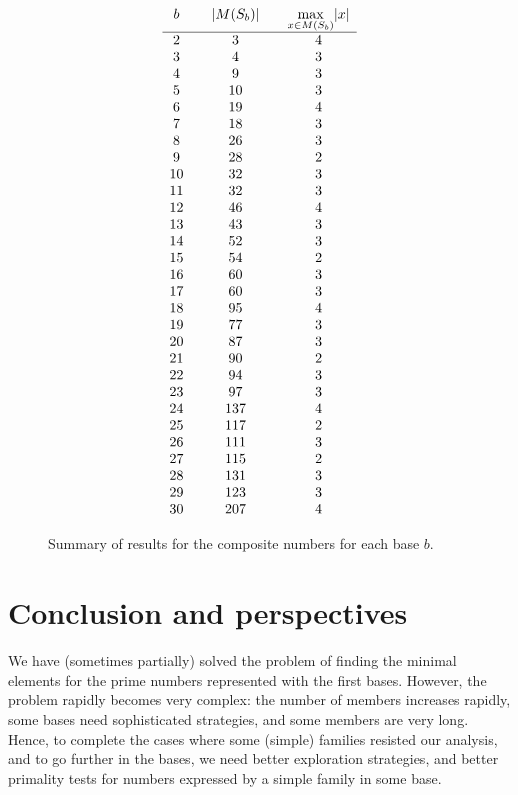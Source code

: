 \documentclass[12pt]{article}
\theoremstyle{plain}
\theoremstyle{definition}
\newcommand{\0}{\mathtt{0}}
\newcommand{\1}{\mathtt{1}}
\newcommand{\2}{\mathtt{2}}
\newcommand{\3}{\mathtt{3}}
\newcommand{\4}{\mathtt{4}}
\newcommand{\5}{\mathtt{5}}
\newcommand{\6}{\mathtt{6}}
\newcommand{\7}{\mathtt{7}}
\newcommand{\8}{\mathtt{8}}
\newcommand{\9}{\mathtt{9}}
\begin{document}
\begin{figure}\[\begin{array}{c@{\qquad}c@{\qquad}c}
b & \lvert M(S_b)\rvert & \max\limits_{x\in M(S_b)}\lvert x\rvert \\ \hline
2 & 3 & 4 \\
3 & 4 & 3 \\
4 & 9 & 3 \\
5 & 10 & 3 \\
6 & 19 & 4 \\
7 & 18 & 3\\
8 & 26 & 3 \\
9 & 28 & 2 \\
10 & 32 & 3 \\
11 & 32 & 3\\
12 & 46 & 4 \\
13 & 43 & 3 \\
14 & 52 & 3 \\
15 & 54 & 2 \\
16 & 60 & 3 \\
17 & 60 & 3 \\
18 & 95 & 4 \\
19 & 77 & 3 \\
20 & 87 & 3 \\
21 & 90 & 2 \\
22 & 94 & 3 \\
23 & 97 & 3 \\
24 & 137 & 4 \\
25 & 117 & 2 \\
26 & 111 & 3 \\
27 & 115 & 2 \\
28 & 131 & 3 \\
29 & 123 & 3 \\
30 & 207 & 4
\end{array}\]
\caption{Summary of results for the composite numbers for each base $b$.}
\label{ttwo}
\end{figure}

\section{Conclusion and perspectives}

We have (sometimes partially) solved the problem of finding the minimal elements for the prime numbers
represented with the first bases. However, the problem rapidly becomes very complex: the number of members
increases rapidly, some bases need sophisticated strategies,
and some members are very long.
Hence, to complete the cases where some (simple) families resisted our analysis, and to go further in the bases,
we need better exploration strategies, and better primality tests for numbers expressed by a simple family in some base.
\end{document}
